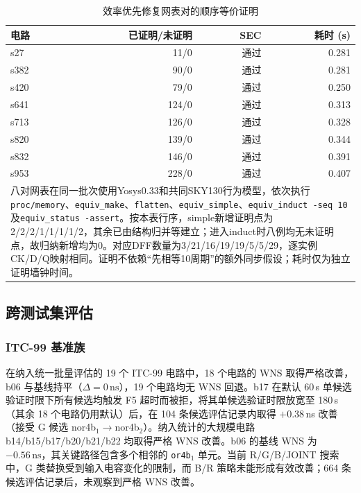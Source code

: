 \documentclass[twocolumn,10pt,fontset=windows]{ctexart}
\begin{document}
\begin{table}[htbp]
\centering
\caption{效率优先修复网表对的顺序等价证明}
\label{tab:sec_iscas8}
\setlength{\tabcolsep}{4pt}
\footnotesize
\begin{tabular}{lrrr}
\toprule
\textbf{电路} & \textbf{已证明/未证明} & \textbf{SEC} & \textbf{耗时 (s)} \\
\midrule
s27 & 11/0 & 通过 & 0.281 \\
s382 & 90/0 & 通过 & 0.281 \\
s420 & 79/0 & 通过 & 0.250 \\
s641 & 124/0 & 通过 & 0.313 \\
s713 & 126/0 & 通过 & 0.328 \\
s820 & 139/0 & 通过 & 0.344 \\
s832 & 146/0 & 通过 & 0.391 \\
s953 & 228/0 & 通过 & 0.407 \\
\bottomrule
\multicolumn{4}{p{0.92\columnwidth}}{\footnotesize 八对网表在同一批次使用Yosys0.33和共同SKY130行为模型，依次执行\texttt{proc/memory}、\texttt{equiv\_make}、\texttt{flatten}、\texttt{equiv\_simple}、\texttt{equiv\_induct -seq 10}及\texttt{equiv\_status -assert}。按本表行序，simple新增证明点为2/2/2/1/1/1/1/2，其余已由结构归并等建立；进入induct时八例均无未证明点，故归纳新增均为0。对应DFF数量为3/21/16/19/19/5/5/29，逐实例CK/D/Q映射相同。证明不依赖“先相等10周期”的额外同步假设；耗时仅为独立证明墙钟时间。}\\
\end{tabular}
\end{table}

\subsection{跨测试集评估}\label{sec:ood}

\subsubsection{ITC-99 基准族}\label{sec:itc99}

在纳入统一批量评估的 19 个 ITC-99 电路中，18 个电路的 WNS 取得严格改善，b06 与基线持平（$\Delta = 0\,\text{ns}$），19 个电路均无 WNS 回退。b17 在默认 60\,s 单候选验证时限下所有候选均触发 F5 超时而被拒，将其单候选验证时限放宽至 180\,s（其余 18 个电路仍用默认）后，在 104 条候选评估记录内取得 $+0.38\,$ns 改善（接受 G 候选 nor4b$_1\!\to\!$nor4b$_2$）。纳入统计的大规模电路 b14/b15/b17/b20/b21/b22 均取得严格 WNS 改善。b06 的基线 WNS 为 $-0.56\,\text{ns}$，其关键路径包含多个相邻的 \texttt{or4b$_1$} 单元。当前 R/G/B/JOINT 搜索中，G 类替换受到输入电容变化的限制，而 B/R 策略未能形成有效改善；664 条候选评估记录后，未观察到严格 WNS 改善。
\end{document}
